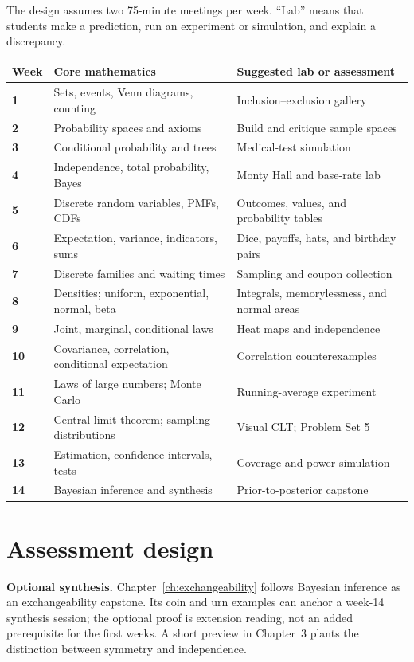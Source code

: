 The design assumes two 75-minute meetings per week. ``Lab'' means that students make a prediction, run an experiment or simulation, and explain a discrepancy.

\begin{center}
\small
\begin{tabularx}{\textwidth}{>{\bfseries}p{}p{}X}
\toprule
Week & Core mathematics & Suggested lab or assessment \\
\midrule
1 & Sets, events, Venn diagrams, counting & Inclusion--exclusion gallery \\
2 & Probability spaces and axioms & Build and critique sample spaces \\
3 & Conditional probability and trees & Medical-test simulation \\
4 & Independence, total probability, Bayes & Monty Hall and base-rate lab \\
5 & Discrete random variables, PMFs, CDFs & Outcomes, values, and probability tables \\
6 & Expectation, variance, indicators, sums & Dice, payoffs, hats, and birthday pairs \\
7 & Discrete families and waiting times & Sampling and coupon collection \\
8 & Densities; uniform, exponential, normal, beta & Integrals, memorylessness, and normal areas \\
9 & Joint, marginal, conditional laws & Heat maps and independence \\
10 & Covariance, correlation, conditional expectation & Correlation counterexamples \\
11 & Laws of large numbers; Monte Carlo & Running-average experiment \\
12 & Central limit theorem; sampling distributions & Visual CLT; Problem Set 5 \\
13 & Estimation, confidence intervals, tests & Coverage and power simulation \\
14 & Bayesian inference and synthesis & Prior-to-posterior capstone \\
\bottomrule
\end{tabularx}
\end{center}

\section*{Assessment design}

\textbf{Optional synthesis.} Chapter~\ref{ch:exchangeability} follows Bayesian inference as an exchangeability capstone. Its coin and urn examples can anchor a week-14 synthesis session; the optional proof is extension reading, not an added prerequisite for the first weeks. A short preview in Chapter~3 plants the distinction between symmetry and independence.

